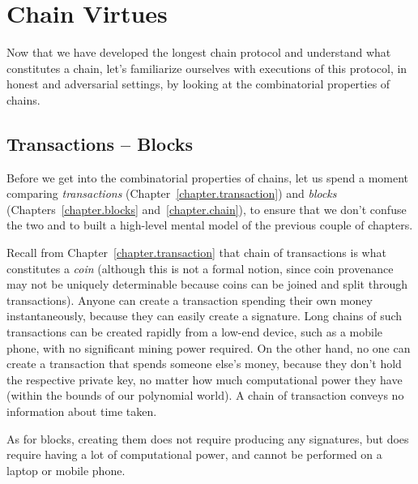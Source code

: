 \chapter{Chain Virtues}\label{chapter.virtues}

Now that we have developed the longest chain protocol and understand
what constitutes a chain, let's familiarize ourselves with executions
of this protocol, in honest and adversarial settings, by looking at
the combinatorial properties of chains.

\section{Transactions -- Blocks}

Before we get into the combinatorial properties of chains, let us spend a moment
comparing \emph{transactions} (Chapter~\ref{chapter.transaction}) and \emph{blocks}
(Chapters~\ref{chapter.blocks} and~\ref{chapter.chain}), to ensure
that we don't confuse the two and to built a high-level mental model of the
previous couple of chapters.

Recall from Chapter~\ref{chapter.transaction} that chain of transactions is what constitutes
a \emph{coin} (although this is not a formal notion, since coin provenance may not be uniquely
determinable because coins can be joined and split through transactions).
Anyone can create a transaction spending their own money instantaneously, because
they can easily create a signature. Long chains of such transactions can be created rapidly
from a low-end device, such as a mobile phone, with no significant mining power required.
On the other hand, no one can create a transaction that spends someone else's money,
because they don't hold the respective private key, no matter how much computational
power they have (within the bounds of our polynomial world). A chain of transaction
conveys no information about time taken.

As for blocks, creating them does not require producing any signatures, but does require
having a lot of computational power, and cannot be performed on a laptop or mobile phone.

